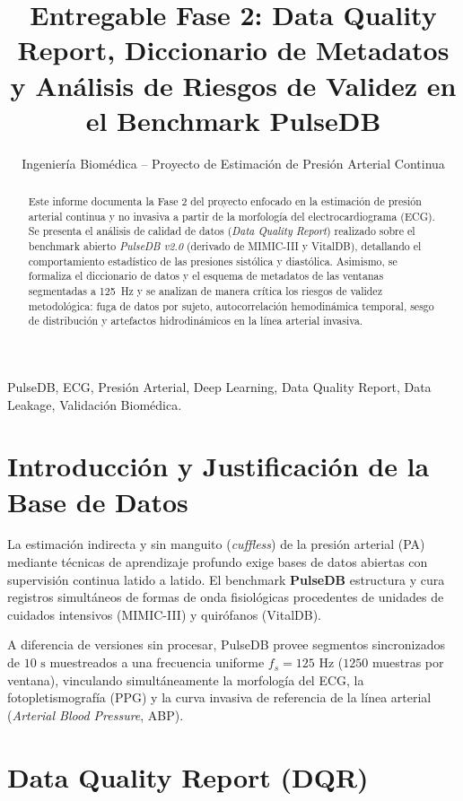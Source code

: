 \documentclass[journal,10pt]{IEEEtran}
\title{Entregable Fase 2: Data Quality Report, Diccionario de Metadatos y Análisis de Riesgos de Validez en el Benchmark PulseDB}
\author{Ingeniería Biomédica -- Proyecto de Estimación de Presión Arterial Continua}
\begin{document}
\maketitle

\begin{abstract}
Este informe documenta la Fase 2 del proyecto enfocado en la estimación de presión arterial continua y no invasiva a partir de la morfología del electrocardiograma (ECG). Se presenta el análisis de calidad de datos (\textit{Data Quality Report}) realizado sobre el benchmark abierto \textit{PulseDB v2.0} (derivado de MIMIC-III y VitalDB), detallando el comportamiento estadístico de las presiones sistólica y diastólica. Asimismo, se formaliza el diccionario de datos y el esquema de metadatos de las ventanas segmentadas a 125~Hz y se analizan de manera crítica los riesgos de validez metodológica: fuga de datos por sujeto, autocorrelación hemodinámica temporal, sesgo de distribución y artefactos hidrodinámicos en la línea arterial invasiva.
\end{abstract}

\begin{IEEEkeywords}
PulseDB, ECG, Presión Arterial, Deep Learning, Data Quality Report, Data Leakage, Validación Biomédica.
\end{IEEEkeywords}

\section{Introducción y Justificación de la Base de Datos}
La estimación indirecta y sin manguito (\textit{cuffless}) de la presión arterial (PA) mediante técnicas de aprendizaje profundo exige bases de datos abiertas con supervisión continua latido a latido. El benchmark \textbf{PulseDB} estructura y cura registros simultáneos de formas de onda fisiológicas procedentes de unidades de cuidados intensivos (MIMIC-III) y quirófanos (VitalDB). 

A diferencia de versiones sin procesar, PulseDB provee segmentos sincronizados de $10\text{ s}$ muestreados a una frecuencia uniforme $f_s = 125\text{ Hz}$ ($1250$ muestras por ventana), vinculando simultáneamente la morfología del ECG, la fotopletismografía (PPG) y la curva invasiva de referencia de la línea arterial (\textit{Arterial Blood Pressure}, ABP).

\section{Data Quality Report (DQR)}
\end{document}
